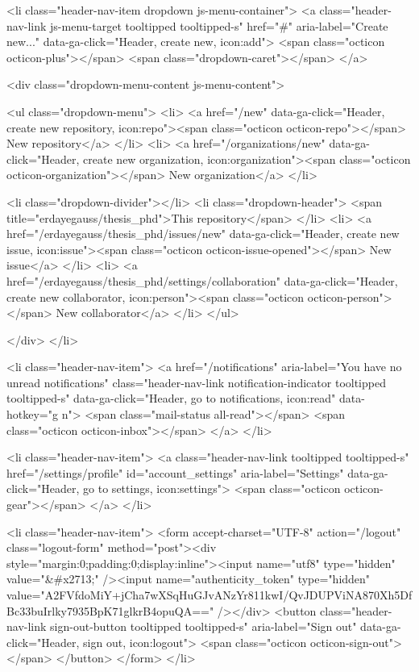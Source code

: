   <li class="header-nav-item dropdown js-menu-container">
    <a class="header-nav-link js-menu-target tooltipped tooltipped-s" href="#" aria-label="Create new..." data-ga-click="Header, create new, icon:add">
      <span class="octicon octicon-plus"></span>
      <span class="dropdown-caret"></span>
    </a>

    <div class="dropdown-menu-content js-menu-content">
      
<ul class="dropdown-menu">
  <li>
    <a href="/new" data-ga-click="Header, create new repository, icon:repo"><span class="octicon octicon-repo"></span> New repository</a>
  </li>
  <li>
    <a href="/organizations/new" data-ga-click="Header, create new organization, icon:organization"><span class="octicon octicon-organization"></span> New organization</a>
  </li>


    <li class="dropdown-divider"></li>
    <li class="dropdown-header">
      <span title="erdayegauss/thesis_phd">This repository</span>
    </li>
      <li>
        <a href="/erdayegauss/thesis_phd/issues/new" data-ga-click="Header, create new issue, icon:issue"><span class="octicon octicon-issue-opened"></span> New issue</a>
      </li>
      <li>
        <a href="/erdayegauss/thesis_phd/settings/collaboration" data-ga-click="Header, create new collaborator, icon:person"><span class="octicon octicon-person"></span> New collaborator</a>
      </li>
</ul>

    </div>
  </li>

  <li class="header-nav-item">
        <a href="/notifications" aria-label="You have no unread notifications" class="header-nav-link notification-indicator tooltipped tooltipped-s" data-ga-click="Header, go to notifications, icon:read" data-hotkey="g n">
        <span class="mail-status all-read"></span>
        <span class="octicon octicon-inbox"></span>
</a>
  </li>

  <li class="header-nav-item">
    <a class="header-nav-link tooltipped tooltipped-s" href="/settings/profile" id="account_settings" aria-label="Settings" data-ga-click="Header, go to settings, icon:settings">
      <span class="octicon octicon-gear"></span>
    </a>
  </li>

  <li class="header-nav-item">
    <form accept-charset="UTF-8" action="/logout" class="logout-form" method="post"><div style="margin:0;padding:0;display:inline"><input name="utf8" type="hidden" value="&#x2713;" /><input name="authenticity_token" type="hidden" value="A2FVfdoMiY+jCha7wXSqHuGJvANzYr811kwI/QvJDUPViNA870Xh5DfBc33buIrlky7935BpK71glkrB4opuQA==" /></div>
      <button class="header-nav-link sign-out-button tooltipped tooltipped-s" aria-label="Sign out" data-ga-click="Header, sign out, icon:logout">
        <span class="octicon octicon-sign-out"></span>
      </button>
</form>  </li>

